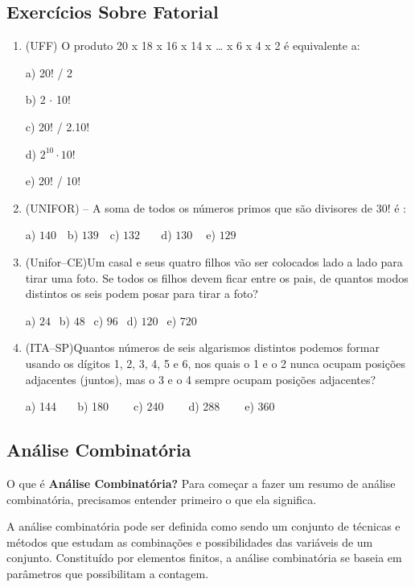\begin{multicols*}{2}
\begin{enumerate}
	\end{enumerate}


	\subsection{Exercícios Sobre Fatorial}

	\begin{enumerate}

\item  (UFF) O produto 20 x 18 x 16 x 14 x … x 6 x 4 x 2 é equivalente a:

a) 20! / 2

b) 2 $\cdot$ 10!

c) 20! / 2.10!

d) $2^{10} \cdot 10!$

e) 20! / 10!

	\item  (UNIFOR) – A soma de todos os números primos que são divisores de 30! é :
	
	a) $140 \ \ \ $ b) $139 \ \ \ $ c) $132 \ \ \ \ \ \ \ $ d) $130 \ \ \ \ $ e) $129 \ \ $

	\item  (Unifor–CE)Um casal e seus quatro filhos vão ser colocados lado a lado para tirar uma foto. Se todos os filhos devem ficar entre os pais, de quantos modos distintos os seis podem posar para tirar a foto?

	a) $24 \ \ $ b) $48 \ \ $ c) $96 \ \ $ d) $120 \ \ $ e) $720 \ \ $

	\item  (ITA–SP)Quantos números de seis algarismos distintos podemos formar usando os dígitos 1, 2, 3, 4, 5 e 6, nos quais o 1 e o 2 nunca ocupam posições adjacentes (juntos), mas o 3 e o 4 sempre ocupam posições adjacentes?

a) 144$ \ \ \ \ \ \ \ $ b) 180 $ \ \ \ \ \ \ \ $ c) 240 $ \ \ \ \ \ \ \ $ d) 288 $ \ \ \ \ \ \ \ $ e) 360
	
	\end{enumerate}

	\subsection{Análise Combinatória}


O que é \textbf{Análise Combinatória?}
Para começar a fazer um resumo de análise combinatória, precisamos entender primeiro o que ela significa.

A análise combinatória pode ser definida como sendo um conjunto de técnicas e métodos que estudam as combinações e possibilidades das variáveis de um conjunto. Constituído por elementos finitos, a análise combinatória se baseia em parâmetros que possibilitam a contagem.


\end{multicols*}

